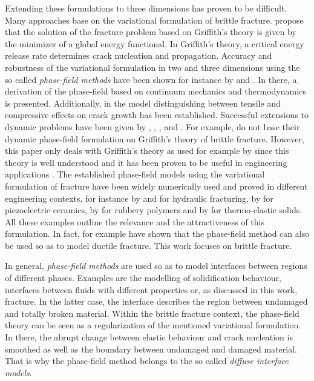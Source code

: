 Extending these formulations to three dimensions has proven to be difficult. Many approaches base on the variational formulation of brittle fracture. \citet{02_B_VarBrittle} propose that the solution of the fracture problem based on Griffith's theory is given by the minimizer of a global energy functional. In Griffith's theory, a critical energy release rate determines crack nucleation and propagation. Accuracy and robustness of the variational formulation in two and three dimensions using the so called \textit{phase-field methods} have been shown for instance by \citet{04_B_VarBrittleProve2} and \citet{03_B_VarBrittleProve1}. In there, a derivation of the phase-field based on continuum mechanics and thermodynamics is presented. Additionally, in \cite{04_B_VarBrittleProve2} the model distinguishing between tensile and compressive effects on crack growth has been established. Successful extensions to dynamic problems have been given by \citet{01_PF_dyn_brittle}, \citet{05_B_dynExtension1}, \citet{06_B_dynExtension2}, \citet{07_B_dynExtension3} and \citet{08_B_dynExtension4}. For example, \citet{10_PH_Mode3} do not base their dynamic phase-field formulation on Griffith's theory of brittle fracture. However, this paper only deals with Griffith's theory as used for example by \citet{08_PF_Gammac2} since this theory is well understood and it has been proven to be useful in engineering applications \citep{01_PF_dyn_brittle}. The established phase-field models using the variational formulation of fracture have been widely numerically used and proved in different engineering contexts, for instance by \citet{11_B_EngProb1} and \citet{12_B_EngProb2} for hydraulic fracturing, by \citet{13_B_EngProb3} for piezoelectric ceramics, by \citet{14_B_EngProb4} for rubbery polymers and by \citet{15_B_EngProb5} for thermo-elastic solids. All these examples outline the relevance and the attractiveness of this formulation. In fact, for example \citet{03_PF_ductile} have shown that the phase-field method can also be used so as to model ductile fracture. This work focuses on brittle fracture. 

In general, \textit{phase-field methods} are used so as to model interfaces between regions of different phases. Examples are the modelling of solidification behaviour, interfaces between fluids with different properties or, as discussed in this work, fracture. In the latter case, the interface describes the region between undamaged and totally broken material. Within the brittle fracture context, the phase-field theory can be seen as a regularization of the mentioned variational formulation. In there, the abrupt change between elastic behaviour and crack nucleation is smoothed as well as the boundary between undamaged and damaged material. That is why the phase-field method belongs to the so called \textit{diffuse interface models}.

